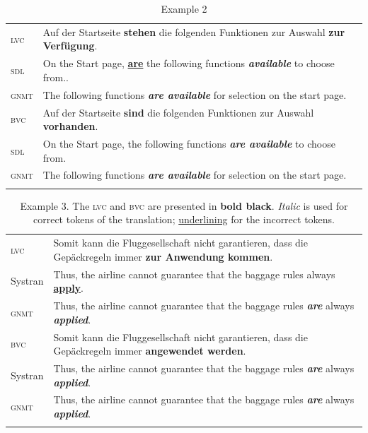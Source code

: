 \documentclass[output=paper]{langsci/langscibook}
\begin{document}
\begin{table}[p]
\caption{Example 2}
\begin{tabularx}{\textwidth}{lQ}
\lsptoprule
\textsc{lvc} &Auf der Startseite \textbf{stehen} die folgenden Funktionen zur Auswahl \textbf{zur Verfügung}.\\
\textsc{sdl} &On the Start page, \uline{\textbf{are}} the following functions \textit{\textbf{available}} to choose from..\\
\textsc{gnmt}&The following functions \textit{\textbf{are available}} for selection on the start page.\\
\midrule
\textsc{bvc} &Auf der Startseite \textbf{sind} die folgenden Funktionen zur Auswahl \textbf{vorhanden}.\\
\textsc{sdl} & On the Start page, the following functions \textit{\textbf{are available}} to choose from.\\
\textsc{gnmt} &The following functions \textit{\textbf{are available}} for selection on the start page.\\
\lspbottomrule
\label{marzouk:table3}
\end{tabularx}
\end{table}

\begin{table}[p]
\caption{Example 3. The \textsc{lvc} and \textsc{bvc} are presented in \textbf{bold black}. \textit{Italic} is used for correct tokens of the translation; \uline{underlining} for the incorrect tokens.\label{marzouk:table4}}
\begin{tabularx}{\textwidth}{lQ}
\lsptoprule
\textsc{lvc}&Somit kann die Fluggesellschaft nicht garantieren, dass die Gepäckregeln immer \textbf{zur Anwendung kommen}.\\
Systran &Thus, the airline cannot guarantee that the baggage rules always \uline{\textbf{apply}}.\\
\textsc{gnmt}&Thus, the airline cannot guarantee that the baggage rules \textit{\textbf{are}} always \textit{\textbf{applied}}.\\
\midrule
\textsc{bvc}&Somit kann die Fluggesellschaft nicht garantieren, dass die Gepäckregeln immer \textbf{angewendet werden}.\\
Systran&Thus, the airline cannot guarantee that the baggage rules \textbf{\textit{are}} always \textbf{\textit{applied}}.\\
\textsc{gnmt}&Thus, the airline cannot guarantee that the baggage rules \textbf{\textit{are}} always \textbf{\textit{applied}}.\\
\lspbottomrule
\end{tabularx}
\end{table}
\end{document}
